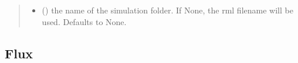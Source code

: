 \documentclass[letterpaper,10pt,english]{sphinxmanual}
\begin{document}
\begin{fulllineitems}
\begin{quote}
\begin{description}
\begin{itemize}
\item {} 
\sphinxAtStartPar
{} (\sphinxstyleliteralemphasis{\sphinxupquote{, }}) \textendash{} the name of the simulation folder. If None, the rml
filename will be used. Defaults to None.

\end{itemize}

\end{description}\end{quote}

\end{fulllineitems}



\subsection{Flux}
\label{\detokenize{code_documentation:flux}}
\end{document}
